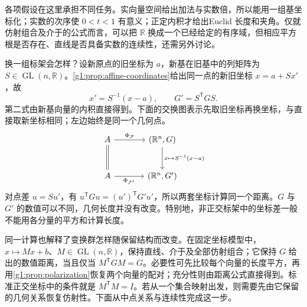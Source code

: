 \ProseParagraphBreak

各项假设在这里承担不同任务。实向量空间给出加法与实数倍，所以能用一组基坐标化；实数的次序使 \(0<t<1\) 有意义；正定内积才给出Euclid 长度和夹角。仅就仿射组合及介于的公式而言，可以把 \(\mathbb R\) 换成一个已经给定的有序域，但相应平方根是否存在、直线是否具备实数的连续性，还需另外讨论。

\ProseParagraphBreak

换一组标架会怎样？设新原点的旧坐标为 \(a\)，新基在旧基中的列矩阵为 \(S\in\operatorname{GL}(n,\mathbb R)\)。\cref{g1:prop:affine-coordinates}给出同一点的新旧坐标 \(x=a+Sx'\)，故
\begin{equation}\label{g1:eq:coordinate-model-change}
	x'=S^{-1}(x-a),\qquad G'=S^{\mathsf T}GS.
\end{equation}
第二式由新基向量的内积直接得到。下面的交换图表示先取旧坐标再换坐标，与直接取新坐标相同；左边始终是同一个几何点。
\[
	\begin{tikzcd}[column sep=large,row sep=large]
		A \arrow[r,"{\Phi_{\mathcal F}}"] \arrow[d,equal]
		& (\mathbb R^n,G) \arrow[d,"{x\mapsto S^{-1}(x-a)}"]\\
		A \arrow[r,"{\Phi_{\mathcal F'}}"']
		& (\mathbb R^n,G')
	\end{tikzcd}
\]
对点差 \(u=Su'\)，有 \(u^{\mathsf T}Gu=(u')^{\mathsf T}G'u'\)，所以两套坐标计算同一个距离。\(G\) 与 \(G'\) 的数值可以不同，几何长度并没有改变。特别地，非正交标架中的坐标差一般不能用各分量的平方和计算长度。

\ProseParagraphBreak

同一计算也解释了变换群怎样随保留结构而改变。在固定坐标模型中，\(x\mapsto Mx+b\)、\(M\in\operatorname{GL}(n,\mathbb R)\)，保持直线、介于及全部仿射组合；它保持 \(G\) 给出的数值距离，当且仅当 \(M^{\mathsf T}GM=G\)。必要性可先比较每个向量的长度平方，再用\cref{g1:prop:polarization}恢复两个向量的配对；充分性则由距离公式直接得到。标准正交坐标中的条件就是 \(M^{\mathsf T}M=I\)。若从一个集合映射出发，则需要先由它保留的几何关系恢复仿射性。下面从中点关系与连续性完成这一步。

